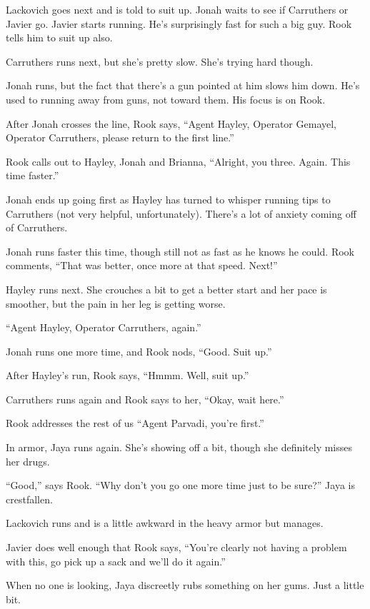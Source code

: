 Lackovich goes next and is told to suit up.   Jonah waits to see if Carruthers or Javier go.  Javier starts running.  He's surprisingly fast for such a big guy.  Rook tells him to suit up also.

Carruthers runs next, but she's pretty slow. She's trying hard though.

Jonah runs, but the fact that there's a gun pointed at him slows him down.  He's used to running away from guns, not toward them.  His focus is on Rook.

After Jonah crosses the line, Rook says, ``Agent Hayley, Operator Gemayel, Operator Carruthers, please return to the first line.''



Rook calls out to Hayley, Jonah and Brianna, ``Alright, you three.  Again. This time faster.''

Jonah ends up going first as Hayley has turned to whisper running tips to Carruthers (not very helpful, unfortunately).  There's a lot of anxiety coming off of Carruthers.

Jonah runs faster this time, though still not as fast as he knows he could.  Rook comments, ``That was better, once more at that speed.  Next!''

Hayley runs next.  She crouches a bit to get a better start and her pace is smoother, but the pain in her leg is getting worse.

``Agent Hayley, Operator Carruthers, again.''

Jonah runs one more time, and Rook nods, ``Good. Suit up.''

After Hayley's run, Rook says, ``Hmmm.   Well, suit up.''

Carruthers runs again and Rook says to her, ``Okay, wait here.''



Rook addresses the rest of us ``Agent Parvadi, you're first.''

In armor, Jaya runs again.  She's showing off a bit, though she definitely misses her drugs.  

``Good,'' says Rook.  ``Why don't you go one more time just to be sure?''  Jaya is crestfallen.

Lackovich runs and is a little awkward in the heavy armor but manages.

Javier does well enough that Rook says, ``You're clearly not having a problem with this, go pick up a sack and we'll do it again.''

When no one is looking, Jaya discreetly rubs something on her gums.  Just a little bit.

